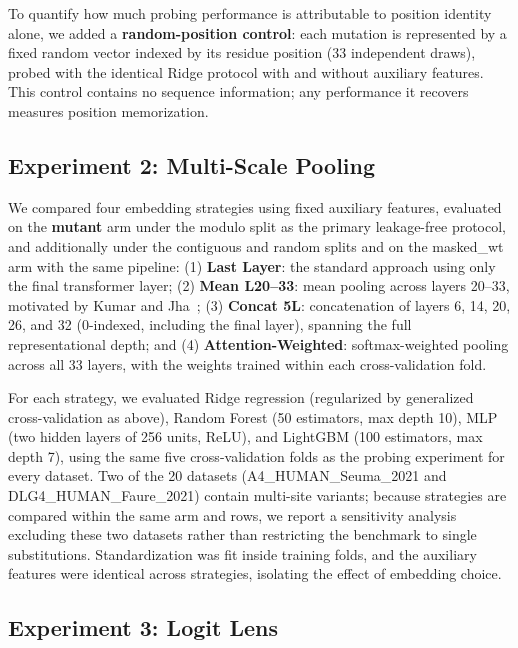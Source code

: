\documentclass[11pt,a4paper]{article}
\newcommand{\revised}[1]{#1}
\newcommand{\rtwo}[1]{#1}
\newcommand{\rthree}[1]{#1}
\begin{document}
\revised{To quantify how much probing performance is attributable to position identity
alone, we added a \textbf{random-position control}: each mutation is represented by a
fixed random vector indexed by its residue position (33 independent draws), probed with
the identical Ridge protocol with and without auxiliary features. This control contains
no sequence information; any performance it recovers measures position memorization.}

\subsection{Experiment 2: Multi-Scale Pooling}

\revised{We compared four embedding strategies using fixed auxiliary features,
evaluated on the \textbf{mutant} arm under the modulo split as the primary
leakage-free protocol\rthree{, and additionally under the contiguous and random splits
and on the masked\_wt arm with the same pipeline}: (1) \textbf{Last Layer}: the standard approach using only the
final transformer layer;
(2) \textbf{Mean L20--33}: mean pooling across layers 20--33, motivated by
Kumar and Jha~\cite{kumar2025};
(3) \textbf{Concat 5L}: concatenation of layers 6, 14, 20, 26, and 32 (0-indexed,
including the final layer), spanning the full representational depth; and
(4) \textbf{Attention-Weighted}: softmax-weighted pooling across all 33 layers, with
the weights trained within each cross-validation fold.}

\revised{For each strategy, we evaluated Ridge regression (regularized by generalized
cross-validation as above), Random Forest (50 estimators,
max depth 10), MLP (two hidden layers of 256 units, ReLU), and LightGBM (100 estimators,
max depth 7)\rtwo{, using the same five cross-validation folds as the probing
experiment for every dataset}. \rthree{Two of the 20 datasets (A4\_HUMAN\_Seuma\_2021
and DLG4\_HUMAN\_Faure\_2021) contain multi-site variants; because strategies are
compared within the same arm and rows, we report a sensitivity analysis excluding
these two datasets rather than restricting the benchmark to single substitutions.} Standardization was fit inside training folds, and the auxiliary
features were identical across strategies, isolating the effect of embedding choice.}

\subsection{Experiment 3: Logit Lens}
\end{document}
